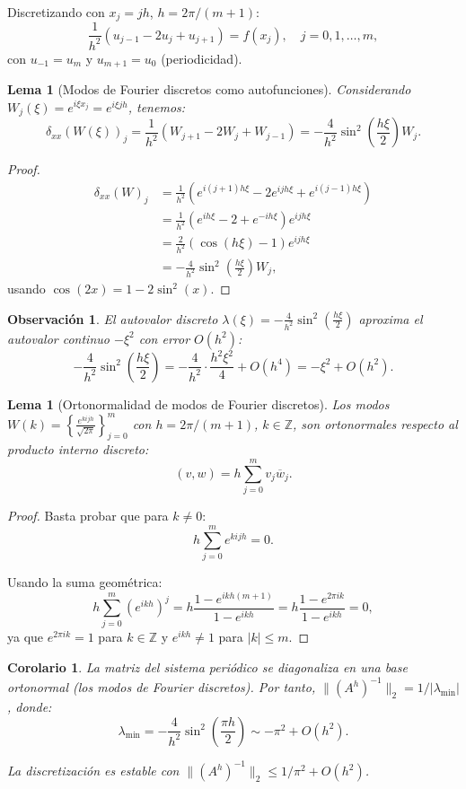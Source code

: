\documentclass[a4paper,11pt]{report}
\newtheorem{lemma}[theorem]{Lema}
\newtheorem{corollary}[theorem]{Corolario}
\newtheorem{remark}[theorem]{Observación}
\begin{document}
Discretizando con $x_j = jh$, $h = 2\pi/(m+1)$:
\[
\frac{1}{h^2} \left( u_{j-1} - 2u_{j} + u_{j+1} \right) = f(x_j), \quad j=0,1,\ldots,m,
\]
con $u_{-1} = u_m$ y $u_{m+1} = u_0$ (periodicidad).

\begin{lemma}[Modos de Fourier discretos como autofunciones]
Considerando $W_j(\xi) = e^{i\xi x_j} = e^{i\xi jh}$, tenemos:
\[
\delta_{xx}(W(\xi))_j = \frac{1}{h^2} \left( W_{j+1} - 2W_j + W_{j-1} \right) = -\frac{4}{h^2} \sin^2\left(\frac{h\xi}{2}\right) W_j.
\]
\end{lemma}
\begin{proof}
\[
\begin{split}
\delta_{xx}(W)_j & = \frac{1}{h^2} \left( e^{i(j+1)h\xi} - 2e^{ijh\xi} + e^{i(j-1)h\xi} \right) \\
& = \frac{1}{h^2} \left( e^{ih\xi} - 2 + e^{-ih\xi} \right) e^{ijh\xi} \\
& = \frac{2}{h^2} \left( \cos(h\xi) - 1 \right) e^{ijh\xi} \\
& = -\frac{4}{h^2} \sin^2\left(\frac{h\xi}{2}\right) W_j,
\end{split}
\]
usando $\cos(2x) = 1 - 2\sin^2(x)$.
\end{proof}

\begin{remark}
El autovalor discreto $\lambda(\xi) = -\frac{4}{h^2} \sin^2\left(\frac{h\xi}{2}\right)$ aproxima el autovalor continuo $-\xi^2$ con error $O(h^2)$:
\[
-\frac{4}{h^2} \sin^2\left(\frac{h\xi}{2}\right) = -\frac{4}{h^2} \cdot \frac{h^2\xi^2}{4} + O(h^4) = -\xi^2 + O(h^2).
\]
\end{remark}

\begin{lemma}[Ortonormalidad de modos de Fourier discretos]
Los modos $W(k) = \left\{ \frac{e^{kijh}}{\sqrt{2\pi}} \right\}_{j=0}^m$ con $h=2\pi/(m+1)$, $k \in \mathbb{Z}$, son ortonormales respecto al producto interno discreto:
\[
(v,w) = h \sum_{j=0}^m v_j \overline{w}_j.
\]
\end{lemma}
\begin{proof}
Basta probar que para $k \neq 0$:
\[
h \sum_{j=0}^m e^{kijh} = 0.
\]

Usando la suma geométrica:
\[
h \sum_{j=0}^m \left( e^{ikh} \right)^j = h \frac{1 - e^{ikh(m+1)}}{1-e^{ikh}} = h \frac{1 - e^{2\pi i k}}{1-e^{ikh}} = 0,
\]
ya que $e^{2\pi ik} = 1$ para $k \in \mathbb{Z}$ y $e^{ikh} \neq 1$ para $|k| \leq m$.
\end{proof}

\begin{corollary}
La matriz del sistema periódico se diagonaliza en una base ortonormal (los modos de Fourier discretos). Por tanto, $\|(A^h)^{-1}\|_2 = 1/|\lambda_{\min}|$, donde:
\[
\lambda_{\min} = -\frac{4}{h^2} \sin^2\left(\frac{\pi h}{2}\right) \sim -\pi^2 + O(h^2).
\]

La discretización es estable con $\|(A^h)^{-1}\|_2 \leq 1/\pi^2 + O(h^2)$.
\end{corollary}
\end{document}
